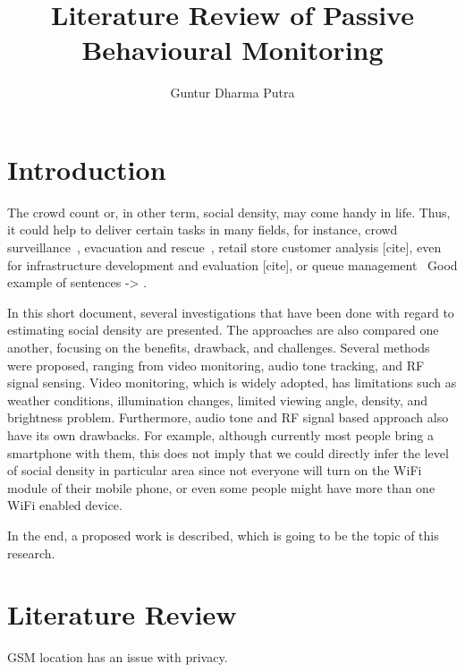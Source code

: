 \documentclass{article}
\begin{document}
\title{Literature Review of Passive Behavioural Monitoring}
\author{Guntur Dharma Putra}

\maketitle



\section{Introduction} %
\label{sec:introduction}
The crowd count or, in other term, social density, may come handy in life. Thus, it could help to deliver certain tasks in many fields, for instance, crowd surveillance~\cite{thesis050}, evacuation and rescue~\cite{thesis053}, retail store customer analysis [cite], even for infrastructure development and evaluation [cite], or queue management~\cite{thesis012} Good example of sentences -> \cite{thesis051}.

In this short document, several investigations that have been done with regard to estimating social density are presented. The approaches are also compared one another, focusing on the benefits, drawback, and challenges. Several methods were proposed, ranging from video monitoring, audio tone tracking, and RF signal sensing. Video monitoring, which is widely adopted, has limitations such as weather conditions, illumination changes, limited viewing angle, density, and brightness problem. Furthermore, audio tone and RF signal based approach also have its own drawbacks. For example, although currently most people bring a smartphone with them, this does not imply that we could directly infer the level of social density in particular area since not everyone will turn on the WiFi module of their mobile phone, or even some people might have more than one WiFi enabled device.

In the end, a proposed work is described, which is going to be the topic of this research.

\section{Literature Review} %
\label{sec:literature_review}
GSM location has an issue with privacy\cite{thesis017}.
\end{document}
